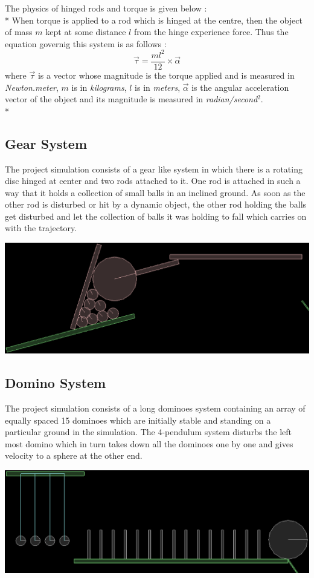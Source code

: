 \documentclass[11pt]{article}
\begin{document}
The physics of hinged rods and torque is given below :\\*
When torque\cite{seesaw} is applied to a rod which is hinged at the centre, then the object of mass $m$ kept at some distance $l$ from the hinge experience force. Thus the equation governig this system is as follows :
\begin{equation}
  \vec{\tau} = \frac{ml^2}{12} \times \vec{\alpha}
\end{equation}
where $\vec{\tau}$ is a vector whose magnitude is the torque applied and is measured in \emph{Newton.meter}, $m$ is in \emph{kilograms}, $l$ is in \emph{meters}, $\vec{\alpha}$ is the angular acceleration vector of the object and its magnitude is measured in \emph{radian/second$^2$}.\\*
\subsection{Gear System}
The project simulation consists of a gear like system in which there is a rotating disc hinged at center and two rods attached to it. One rod is attached in such a way that it holds a collection of small balls in an inclined ground. As soon as the other rod is disturbed or hit by a dynamic object, the other rod holding the balls get disturbed and let the collection of balls it was holding to fall which carries on with the trajectory.
\begin{center}
\includegraphics[scale=0.5]{gear}
\end{center} 
\subsection{Domino System}
The project simulation consists of a long dominoes system containing an array of equally spaced 15 dominoes which are initially stable and standing on a particular ground in the simulation. The 4-pendulum system disturbs the left most domino which in turn takes down all the dominoes one by one and gives velocity to a sphere at the other end.
\begin{center}
\includegraphics[scale=0.5]{domino}
\end{center}
\end{document}
